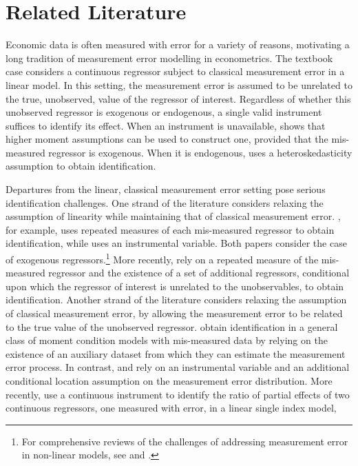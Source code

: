 \section{Related Literature}
Economic data is often measured with error for a variety of reasons, motivating a long tradition of measurement error modelling in econometrics. 
The textbook case considers a continuous regressor subject to classical measurement error in a linear model.
In this setting, the measurement error is assumed to be unrelated to the true, unobserved, value of the regressor of interest.
Regardless of whether this unobserved regressor is exogenous or endogenous, a single valid instrument suffices to identify its effect.
When an instrument is unavailable, \cite{lewbel1997} shows that higher moment assumptions can be used to construct one, provided that the mis-measured regressor is exogenous.
When it is endogenous, \cite{lewbel2012} uses a heteroskedasticity assumption to obtain identification.

Departures from the linear, classical measurement error setting pose serious identification challenges.
One strand of the literature considers relaxing the assumption of linearity while maintaining that of classical measurement error.
\cite{schennach2004}, for example, uses repeated measures of each mis-measured regressor to obtain identification, while \cite{schennach2007} uses an instrumental variable.  
Both papers consider the case of exogenous regressors.\footnote{For comprehensive reviews of the challenges of addressing measurement error in non-linear models, see  \cite{chensurvey} and \cite{SchennachSurvey}.}
More recently, \cite{SongSchennachWhite} rely on a repeated measure of the mis-measured regressor and the existence of a set of additional regressors, conditional upon which the regressor of interest is unrelated to the unobservables, to obtain identification.      
Another strand of the literature considers relaxing the assumption of classical measurement error, by allowing the measurement error to be related to the true value of the unobserved regressor.
\cite{ChenHongTamer} obtain identification in a general class of moment condition models with mis-measured data by relying on the existence of an auxiliary dataset from which they can estimate the measurement error process.
In contrast, \cite{HuSchennach} and \cite{song2015} rely on an instrumental variable and an additional conditional location assumption on the measurement error distribution. 
More recently, \cite{HuShiuWoutersen} use a continuous instrument to identify the ratio of partial effects of two continuous regressors, one measured with error, in a linear single index model, 

